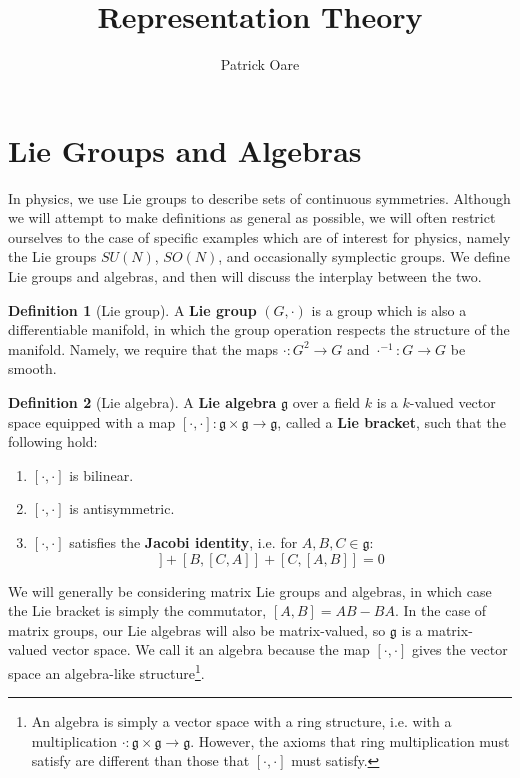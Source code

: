 \documentclass[11pt, oneside]{article}   	%
\title{Representation Theory}
\author{Patrick Oare}
\date{}							%
\theoremstyle{definition}
\newtheorem{definition}{Definition}[section]
\begin{document}
\maketitle

\section{Lie Groups and Algebras}

In physics, we use Lie groups to describe sets of continuous symmetries. Although we will attempt to 
make definitions as general as possible, we will often restrict ourselves to the case of specific 
examples which are of interest for physics, namely the Lie groups $SU(N)$, $SO(N)$, and 
occasionally symplectic groups. We define Lie groups and algebras, and then will discuss the 
interplay between the two.

\begin{definition}[Lie group]
	A \textbf{Lie group} $(G, \cdot)$ is a group which is also a differentiable manifold, in which the 
	group operation respects the structure of the manifold. Namely, we require that the maps 
	$\cdot : G^2\rightarrow G$ and $\cdot^{-1} : G\rightarrow G$ be smooth.
\end{definition}

\begin{definition}[Lie algebra]
	A \textbf{Lie algebra} $\mathfrak g$ over a field $k$ is a $k$-valued vector space equipped with 
	a map $[\cdot, \cdot] : \mathfrak g\times\mathfrak g\rightarrow\mathfrak g$, called a \textbf{Lie 
	bracket}, such that the following hold:
	\begin{enumerate}
		\item $[\cdot, \cdot]$ is bilinear.
		\item $[\cdot, \cdot]$ is antisymmetric. 
		\item $[\cdot, \cdot]$ satisfies the \textbf{Jacobi identity}, i.e. for $A, B, C\in\mathfrak g$:
		\begin{equation}
			[A, [B, C]] + [B, [C, A]] + [C, [A, B]] = 0
		\end{equation}
	\end{enumerate}
\end{definition}

We will generally be considering matrix Lie groups and algebras, in which case the Lie bracket is 
simply the commutator, $[A, B] = AB - BA$. In the case of matrix groups, our Lie algebras will 
also be matrix-valued, so $\mathfrak g$ is a matrix-valued vector space. We call it an algebra 
because the map $[\cdot, \cdot]$ gives the vector space an algebra-like structure\footnote{An 
algebra is simply a vector space with a ring structure, i.e. with a multiplication $\cdot : \mathfrak 
g\times \mathfrak g \rightarrow\mathfrak g$. However, the axioms that ring multiplication must satisfy 
are different than those that $[\cdot, \cdot]$ must satisfy.}.
\end{document}
